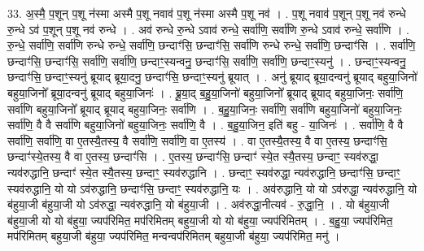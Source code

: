 \documentclass[17pt]{extarticle}
\begin{document}
33. अ॒स्मै॒ प॒शून् प॒शू न॑स्मा अस्मै प॒शू नवाव॑ प॒शू न॑स्मा अस्मै प॒शू नव॑ । . प॒शू नवाव॑ प॒शून् प॒शू नव॑ रुन्धे रु॒न्धे ऽव॑ प॒शून् प॒शू नव॑ रुन्धे । . अव॑ रुन्धे रु॒न्धे ऽवाव॑ रुन्धे॒ सर्वा॑णि॒ सर्वा॑णि रु॒न्धे ऽवाव॑ रुन्धे॒ सर्वा॑णि । . रु॒न्धे॒ सर्वा॑णि॒ सर्वा॑णि रुन्धे रुन्धे॒ सर्वा॑णि॒ छन्दाꣳ॑सि॒ छन्दाꣳ॑सि॒ सर्वा॑णि रुन्धे रुन्धे॒ सर्वा॑णि॒ छन्दाꣳ॑सि । . सर्वा॑णि॒ छन्दाꣳ॑सि॒ छन्दाꣳ॑सि॒ सर्वा॑णि॒ सर्वा॑णि॒ छन्दाꣳ॒॒स्यन्वनु॒ छन्दाꣳ॑सि॒ सर्वा॑णि॒ सर्वा॑णि॒ छन्दाꣳ॒॒स्यनु॑ । . छन्दाꣳ॒॒स्यन्वनु॒ छन्दाꣳ॑सि॒ छन्दाꣳ॒॒स्यनु॑ ब्रूयाद् ब्रूया॒दनु॒ छन्दाꣳ॑सि॒ छन्दाꣳ॒॒स्यनु॑ ब्रूयात् । . अनु॑ ब्रूयाद् ब्रूया॒दन्वनु॑ ब्रूयाद् बहुया॒जिनो॑ बहुया॒जिनो᳚ ब्रूया॒दन्वनु॑ ब्रूयाद् बहुया॒जिनः॑ । . ब्रू॒या॒द् ब॒हु॒या॒जिनो॑ बहुया॒जिनो᳚ ब्रूयाद् ब्रूयाद् बहुया॒जिनः॒ सर्वा॑णि॒ सर्वा॑णि बहुया॒जिनो᳚ ब्रूयाद् ब्रूयाद् बहुया॒जिनः॒ सर्वा॑णि । . ब॒हु॒या॒जिनः॒ सर्वा॑णि॒ सर्वा॑णि बहुया॒जिनो॑ बहुया॒जिनः॒ सर्वा॑णि॒ वै वै सर्वा॑णि बहुया॒जिनो॑ बहुया॒जिनः॒ सर्वा॑णि॒ वै । . ब॒हु॒या॒जिन॒ इति॑ बहु - या॒जिनः॑ । . सर्वा॑णि॒ वै वै सर्वा॑णि॒ सर्वा॑णि॒ वा ए॒तस्यै॒तस्य॒ वै सर्वा॑णि॒ सर्वा॑णि॒ वा ए॒तस्य॑ । . वा ए॒तस्यै॒तस्य॒ वै वा ए॒तस्य॒ छन्दाꣳ॑सि॒ छन्दाꣳ॑स्ये॒तस्य॒ वै वा ए॒तस्य॒ छन्दाꣳ॑सि । . ए॒तस्य॒ छन्दाꣳ॑सि॒ छन्दाꣳ॑ स्ये॒त स्यै॒तस्य॒ छन्दाꣳ॒॒ स्यव॑रुद्धा॒ न्यव॑रुद्धानि॒ छन्दाꣳ॑ स्ये॒त स्यै॒तस्य॒ छन्दाꣳ॒॒ स्यव॑रुद्धानि । . छन्दाꣳ॒॒ स्यव॑रुद्धा॒ न्यव॑रुद्धानि॒ छन्दाꣳ॑सि॒ छन्दाꣳ॒॒ स्यव॑रुद्धानि॒ यो यो ऽव॑रुद्धानि॒ छन्दाꣳ॑सि॒ छन्दाꣳ॒॒ स्यव॑रुद्धानि॒ यः । . अव॑रुद्धानि॒ यो यो ऽव॑रुद्धा॒ न्यव॑रुद्धानि॒ यो ब॑हुया॒जी ब॑हुया॒जी यो ऽव॑रुद्धा॒ न्यव॑रुद्धानि॒ यो ब॑हुया॒जी । . अव॑रुद्धा॒नीत्यव॑ - रु॒द्धा॒नि॒ । . यो ब॑हुया॒जी ब॑हुया॒जी यो यो ब॑हुया॒ ज्यप॑रिमित॒ मप॑रिमितम् बहुया॒जी यो यो ब॑हुया॒ ज्यप॑रिमितम् । . ब॒हु॒या॒ ज्यप॑रिमित॒ मप॑रिमितम् बहुया॒जी ब॑हुया॒ ज्यप॑रिमित॒ मन्वन्वप॑रिमितम् बहुया॒जी ब॑हुया॒ ज्यप॑रिमित॒ मनु॑ । \newline
\end{document}
